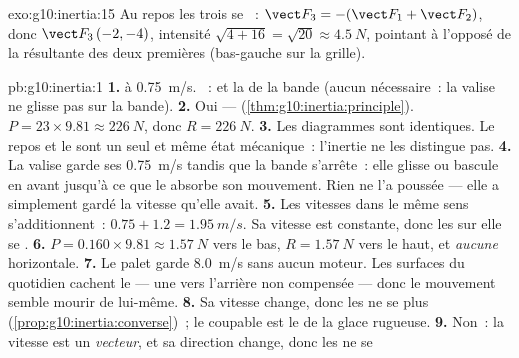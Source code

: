 \begin{solution}{exo:g10:inertia:15}
Au repos les trois  se
~:
$\vect F_3 = -(\vect F_1 + \vect F_2)$, donc
$\vect F_3\,(-2, -4)$, intensité $\sqrt{4 + 16} = \sqrt{20} \approx
\qty{4.5}{N}$, pointant à l'opposé de la résultante des deux premières
(bas-gauche sur la grille).
\end{solution}

\begin{solution}{pb:g10:inertia:1}
\textbf{1.}  à
\qty{0.75}{m/s}. ~:  et la
 de la bande (aucun
 nécessaire~: la valise ne glisse pas sur la
bande).
\textbf{2.} Oui --- 
(\cref{thm:g10:inertia:principle}). $P = 23 \times 9.81 \approx
\qty{226}{N}$, donc $R = \qty{226}{N}$.
\textbf{3.} Les diagrammes sont identiques. Le repos et le
 sont un seul et même état
mécanique~: l'inertie ne les distingue pas.
\textbf{4.} La valise garde ses \qty{0.75}{m/s} tandis que la bande
s'arrête~: elle glisse ou bascule en avant jusqu'à ce que le
 absorbe son mouvement. Rien ne l'a poussée ---
elle a simplement gardé la vitesse qu'elle avait.
\textbf{5.} Les vitesses dans le même sens s'additionnent~:
$0.75 + 1.2 = \qty{1.95}{m/s}$. Sa vitesse est constante, donc les
 sur elle se .
\textbf{6.} $P = 0.160 \times 9.81 \approx \qty{1.57}{N}$ vers le bas,
$R = \qty{1.57}{N}$ vers le haut, et \emph{aucune}
 horizontale.
\textbf{7.} Le palet garde \qty{8.0}{m/s} sans aucun moteur. Les
surfaces du quotidien cachent le  --- une
 vers l'arrière non compensée --- donc le mouvement
semble mourir de lui-même.
\textbf{8.} Sa vitesse change, donc les  ne se
 plus (\cref{prop:g10:inertia:converse})~; le
coupable est le  de la glace rugueuse.
\textbf{9.} Non~: la vitesse est un \emph{vecteur}, et sa direction
change, donc les  ne se 

\end{solution}
